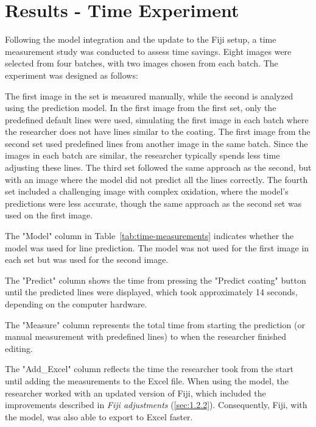 \section{Results - Time Experiment}

Following the model integration and the update to the Fiji setup, a time measurement study was conducted to assess time savings. Eight images were selected from four batches, with two images chosen from each batch. The experiment was designed as follows:

The first image in the set is measured manually, while the second is analyzed using the prediction model. In the first image from the first set, only the predefined default lines were used, simulating the first image in each batch where the researcher does not have lines similar to the coating. The first image from the second set used predefined lines from another image in the same batch. Since the images in each batch are similar, the researcher typically spends less time adjusting these lines. The third set followed the same approach as the second, but with an image where the model did not predict all the lines correctly. The fourth set included a challenging image with complex oxidation, where the model's predictions were less accurate, though the same approach as the second set was used on the first image.

The "Model" column in Table~\ref{tab:time-measurements} indicates whether the model was used for line prediction. The model was not used for the first image in each set but was used for the second image.

The "Predict" column shows the time from pressing the "Predict coating" button until the predicted lines were displayed, which took approximately 14 seconds, depending on the computer hardware. 

The "Measure" column represents the total time from starting the prediction (or manual measurement with predefined lines) to when the researcher finished editing. 

The "Add\_Excel" column reflects the time the researcher took from the start until adding the measurements to the Excel file. When using the model, the researcher worked with an updated version of Fiji, which included the improvements described in \textit{Fiji adjustments} (\ref{sec:1.2.2}). Consequently, Fiji, with the model, was also able to export to Excel faster.


